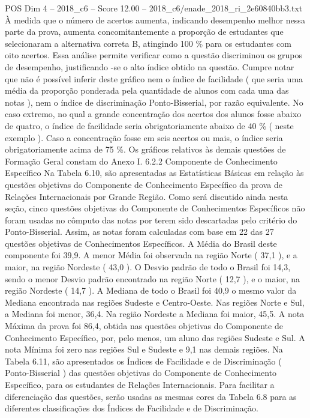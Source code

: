 \begin{textsample}{POS Dim 4 – 2018\_c6 – Score 12.00 – 2018\_c6/enade\_2018\_ri\_2e60840bb3.txt}
À medida que o número de acertos aumenta, indicando desempenho melhor nessa parte da prova, aumenta concomitantemente a proporção de estudantes que selecionaram a alternativa correta B, atingindo 100 \% para os estudantes com oito acertos.
Essa análise permite verificar como a questão discriminou os grupos de desempenho, justificando -se o alto índice obtido na questão.
Cumpre notar que não é possível inferir deste gráfico nem o índice de facilidade ( que seria uma média da proporção ponderada pela quantidade de alunos com cada uma das notas ), nem o índice de discriminação Ponto-Bisserial, por razão equivalente.
No caso extremo, no qual a grande concentração dos acertos dos alunos fosse abaixo de quatro, o índice de facilidade seria obrigatoriamente abaixo de 40 \% ( neste exemplo ).
Caso a concentração fosse em seis acertos ou mais, o índice seria obrigatoriamente acima de 75 \%.
Os gráficos relativos às demais questões de Formação Geral constam do Anexo I. 6.2.2 Componente de Conhecimento Específico Na Tabela 6.10, são apresentadas as Estatísticas Básicas em relação às questões objetivas do Componente de Conhecimento Específico da prova de Relações Internacionais por Grande Região.
Como será discutido ainda nesta seção, cinco questões objetivas do Componente de Conhecimentos Específicos não foram usadas no cômputo das notas por terem sido descartadas pelo critério do Ponto-Bisserial.
Assim, as notas foram calculadas com base em 22 das 27 questões objetivas de Conhecimentos Específicos.
A Média do Brasil deste componente foi 39,9.
A menor Média foi observada na região Norte ( 37,1 ), e a maior, na região Nordeste ( 43,0 ).
O Desvio padrão de todo o Brasil foi 14,3, sendo o menor Desvio padrão encontrado na região Norte ( 12,7 ), e o maior, na região Nordeste ( 14,7 ).
A Mediana de todo o Brasil foi 40,9 o mesmo valor da Mediana encontrada nas regiões Sudeste e Centro-Oeste.
Nas regiões Norte e Sul, a Mediana foi menor, 36,4.
Na região Nordeste a Mediana foi maior, 45,5.
A nota Máxima da prova foi 86,4, obtida nas questões objetivas do Componente de Conhecimento Específico, por, pelo menos, um aluno das regiões Sudeste e Sul.
A nota Mínima foi zero nas regiões Sul e Sudeste e 9,1 nas demais regiões.
Na Tabela 6.11, são apresentados os Índices de Facilidade e de Discriminação ( Ponto-Bisserial ) das questões objetivas do Componente de Conhecimento Específico, para os estudantes de Relações Internacionais.
Para facilitar a diferenciação das questões, serão usadas as mesmas cores da Tabela 6.8 para as diferentes classificações dos Índices de Facilidade e de Discriminação.

\end{textsample}
